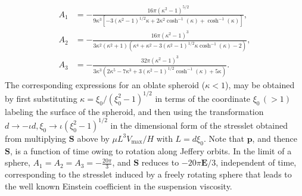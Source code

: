 \documentclass{jfm}
\begin{document}
\begin{align}
A_1&=-\frac{16\pi(\kappa^2-1)^{5/2}}{9\kappa^3[-3(\kappa^2-1)^{1/2}\kappa+2\kappa^2 \cosh^{-1}(\kappa)+\cosh ^{-1}(\kappa)]},\\
A_2&=-\frac{16\pi(\kappa^2-1)^3}{3\kappa^2(\kappa^2+1)(\kappa^4+\kappa^2-3(\kappa^2-1)^{1/2}\kappa\cosh^{-1}(\kappa)-2)},\\
A_3&=-\frac{32\pi(\kappa^2-1)^3}{3\kappa^3(2\kappa^5-7\kappa^3+3(\kappa^2-1)^{1/2}\cosh^{-1}(\kappa)+5\kappa)}.
\end{align}
The corresponding expressions for an oblate spheroid ($\kappa<1$), may be obtained by first substituting $\kappa=\xi_0/(\xi_0^2-1)^{1/2}$ in terms of the coordinate $\xi_0\,(>1)$ labeling the surface of the spheroid, and then using the transformation $d\to-\iota d, \xi_0\to\iota(\xi_0^2-1)^{1/2}$ in the dimensional form of the stresslet obtained from multiplying $\bm{S}$ above by $\mu L^3 V_\text{max}/H$ with $L= d\xi_0$\citep{navaneeth2017}. Note that $\bm{p}$, and thence $\bm{S}$, is a function of time owing to rotation along Jeffery orbits. In the limit of a sphere, $A_1 = A_2 = A_3 = -\frac{20\pi}{3}$, and $\bm{S}$ reduces to $-20\pi\bm{E}/3$, independent of time, corresponding to the stresslet induced by a freely rotating sphere that leads to the well known Einstein coefficient in the suspension viscosity.
\end{document}
